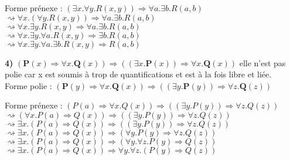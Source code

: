 \documentclass{article}
\begin{document}
Forme prénexe :
\vspace{0.1cm}
$(\exists x.\forall y.R(x,y))\Rightarrow \forall a.\exists b.R(a,b)$\\

$\rightsquigarrow \forall x.(\forall y.R(x,y))\Rightarrow \forall a.\exists b.R(a,b)$\\

$\rightsquigarrow \forall x.\exists y.R(x,y)\Rightarrow \forall a.\exists b.R(a,b)$\\

$\rightsquigarrow \forall x.\exists y.\forall a.R(x,y)\Rightarrow \exists b.R(a,b)$\\

$\rightsquigarrow \forall x.\exists y.\forall a. \exists b. R(x,y)\Rightarrow R(a,b)$\\


\vspace{0.5cm}

\textbf{4)} $(\textbf{P}(x) \Rightarrow \forall x. \textbf{Q}(x)) \Rightarrow ((\exists x. \textbf{P}(x)) \Rightarrow \forall x. \textbf{Q}(x))$ elle n'est pas polie car x est soumis à trop de quantifications et est à la fois libre et liée.
\\

Forme polie :
\vspace{0.1cm}
 $(\textbf{P}(y) \Rightarrow \forall x. \textbf{Q}(x)) \Rightarrow ((\exists y. \textbf{P}(y)) \Rightarrow \forall z. \textbf{Q}(z))$


Forme prénexe :
\vspace{0.1cm}
$(P(a) \Rightarrow \forall x.Q(x)) \Rightarrow ((\exists y.P(y))  \Rightarrow \forall z.Q(z))$\\

$\rightsquigarrow (\forall x.P(a) \Rightarrow Q(x)) \Rightarrow ((\exists y.P(y))  \Rightarrow \forall z.Q(z))$\\

$\rightsquigarrow \exists x.(P(a) \Rightarrow Q(x)) \Rightarrow ((\exists y.P(y))  \Rightarrow \forall z.Q(z))$\\

$\rightsquigarrow \exists x.(P(a) \Rightarrow Q(x)) \Rightarrow (\forall y.P(y)  \Rightarrow \forall z.Q(z))$\\

$\rightsquigarrow \exists x.(P(a) \Rightarrow Q(x)) \Rightarrow (\forall y.\forall z.P(y)  \Rightarrow Q(z))$\\

$\rightsquigarrow \exists x.(P(a) \Rightarrow Q(x)) \Rightarrow \forall y.\forall z.(P(y)  \Rightarrow Q(z))$\\
\end{document}
